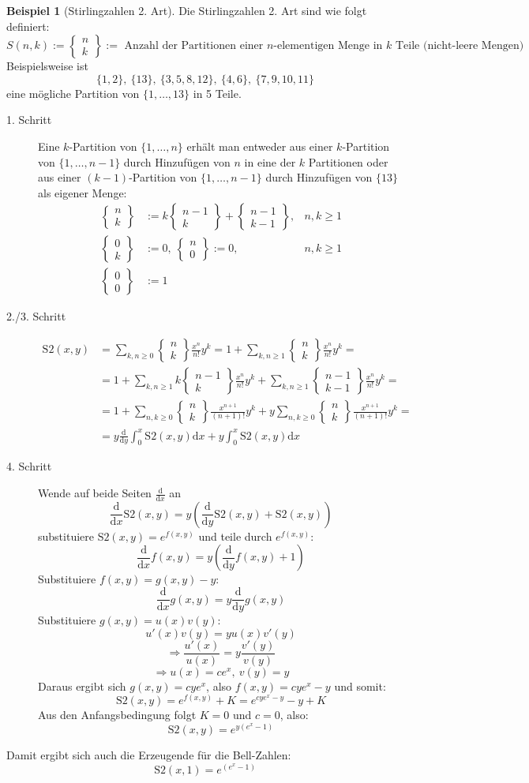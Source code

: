 \documentclass[a4paper,ngerman]{scrartcl}
\theoremstyle{definition}
\newtheorem{bsp}[defn]{Beispiel}
\theoremstyle{plain}
\theoremstyle{remark}
\newcommand{\Stirling}[2]{\left\lbrace\begin{matrix}#1 \\ #2\end{matrix}\right\rbrace}
\newcommand{\SZwei}{\mathrm{S}\!\!2}
\newcommand{\dd}{\mathrm{d}}
\begin{document}
\begin{bsp}[Stirlingzahlen 2. Art]
Die Stirlingzahlen 2. Art sind wie folgt definiert:
\[S(n,k) := \Stirling{n}{k} := \text{ Anzahl der Partitionen einer }n\text{-elementigen Menge in }k\text{ Teile (nicht-leere Mengen)}\]
Beispielsweise ist 
\[\{1,2\}, ~ \{13\}, ~ \{3,5,8,12\}, ~ \{4,6\}, ~ \{7,9,10,11\}\]
eine mögliche Partition von $\{1, \dots, 13\}$ in 5 Teile.

\begin{description}
	\item[1. Schritt]
		Eine $k$-Partition von $\{1, \dots, n\}$ erhält man entweder aus einer $k$-Partition von $\{1, \dots, n-1\}$ durch Hinzufügen von $n$ in eine der $k$ Partitionen oder aus einer $(k-1)$-Partition von $\{1, \dots, n-1\}$ durch Hinzufügen von $\{13\}$ als eigener Menge:
		\begin{align*}
		\Stirling{n}{k} &:= k \Stirling{n-1}{k} + \Stirling{n-1}{k-1},	&n, k \geq 1 \\
		\Stirling{0}{k} &:= 0, ~ \Stirling{n}{0} := 0, 				&n,k \geq 1  \\
		\Stirling{0}{0} &:= 1
		\end{align*}


	\item[2./3. Schritt]
		\begin{align*}
		\SZwei(x,y) &= \sum_{k,n \geq 0} \Stirling{n}{k} \frac{x^n}{n!} y^k = 1 + \sum_{k,n \geq 1} \Stirling{n}{k} \frac{x^n}{n!} y^k = \\
				&= 1 + \sum_{k,n \geq 1} k\Stirling{n-1}{k} \frac{x^n}{n!} y^k + \sum_{k,n \geq 1} \Stirling{n-1}{k-1} \frac{x^n}{n!} y^k = \\
				&= 1 + \sum_{n,k \geq 0}\Stirling{n}{k} \frac{x^{n+1}}{(n+1)!} y^k + y \sum_{n,k \geq 0} \Stirling{n}{k}\frac{x^{n+1}}{(n+1)!} y^k = \\
				&= y\frac{\dd}{\dd y} \int_0^x\SZwei(x,y)\dd x + y\int_0^x\SZwei(x,y)\dd x
		\end{align*}


	\item[4. Schritt]
		Wende auf beide Seiten $\frac{\dd}{\dd x}$ an
		\[\frac{\dd}{\dd x} \SZwei(x,y) = y\left(\frac{\dd}{\dd y}\SZwei(x,y) + \SZwei(x,y)\right)\]
		substituiere $\SZwei(x,y) = e^{f(x,y)}$ und teile durch $e^{f(x,y)}$:
		\[\frac{\dd}{\dd x} f(x,y) = y\left(\frac{\dd}{\dd y}f(x,y) + 1\right)\]
		Substituiere $f(x,y) = g(x,y)-y$:
		\[\frac{\dd}{\dd x} g(x,y) = y\frac{\dd}{\dd y}g(x,y)\]
		Substituiere $g(x,y) = u(x)v(y)$:
		\[u'(x)v(y) = y u(x)v'(y)\]
		\[\Rightarrow \frac{u'(x)}{u(x)} = y\frac{v'(y)}{v(y)}\]
		\[\Rightarrow u(x) = ce^{x},~ v(y) = y\]
		Daraus ergibt sich $g(x,y) = c y e^{x}$, also $f(x,y) = c y e^{x} - y$ und somit:
		\[\SZwei(x,y) = e^{f(x,y)} + K = e^{cye^{x}-y} - y + K\]
		Aus den Anfangsbedingung folgt $K = 0$ und $c = 0$, also:
		\[\SZwei(x,y) = e^{y(e^{x} -1)}\]
		
\end{description}

\end{bsp}

Damit ergibt sich auch die Erzeugende für die Bell-Zahlen: 
\[\SZwei(x,1) = e^{(e^{x} -1)}\]




\end{document}

